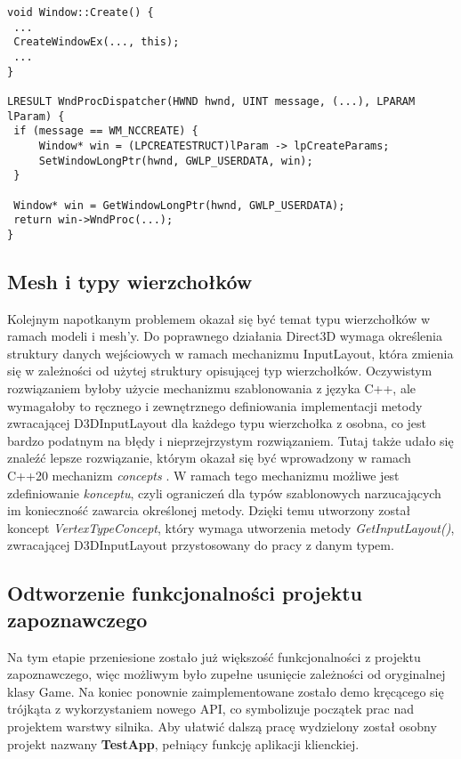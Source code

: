 \begin{lstlisting}[caption={Pseudokod integracji wskaźnika okna z uchwytem HWND}, label={lst:d3d11:render}]
void Window::Create() {
 ...
 CreateWindowEx(..., this);
 ...
}

LRESULT WndProcDispatcher(HWND hwnd, UINT message, (...), LPARAM lParam) {
 if (message == WM_NCCREATE) {
     Window* win = (LPCREATESTRUCT)lParam -> lpCreateParams;
     SetWindowLongPtr(hwnd, GWLP_USERDATA, win);
 }
	
 Window* win = GetWindowLongPtr(hwnd, GWLP_USERDATA);
 return win->WndProc(...);
}
\end{lstlisting}

\subsection{Mesh i typy wierzchołków}
Kolejnym napotkanym problemem okazał się być temat typu wierzchołków w ramach modeli i mesh'y. Do poprawnego działania Direct3D wymaga określenia struktury danych wejściowych w ramach mechanizmu InputLayout, która zmienia się w zależności od użytej struktury opisującej typ wierzchołków. Oczywistym rozwiązaniem byłoby użycie mechanizmu szablonowania z języka C++, ale wymagałoby to ręcznego i zewnętrznego definiowania implementacji metody zwracającej D3DInputLayout dla każdego typu wierzchołka z osobna, co jest bardzo podatnym na błędy i nieprzejrzystym rozwiązaniem. Tutaj także udało się znaleźć lepsze rozwiązanie, którym okazał się być wprowadzony w ramach C++20 mechanizm \textit{concepts} \cite{cpp20:concepts:2025}. W ramach tego mechanizmu możliwe jest zdefiniowanie \textit{konceptu}, czyli ograniczeń dla typów szablonowych narzucających im konieczność zawarcia określonej metody. Dzięki temu utworzony został koncept \textit{VertexTypeConcept}, który wymaga utworzenia metody \textit{GetInputLayout()}, zwracającej D3DInputLayout przystosowany do pracy z danym typem.

\subsection{Odtworzenie funkcjonalności projektu zapoznawczego}
Na tym etapie przeniesione zostało już większość funkcjonalności z projektu zapoznawczego, więc możliwym było zupełne usunięcie zależności od oryginalnej klasy Game. Na koniec ponownie zaimplementowane zostało demo kręcącego się trójkąta z wykorzystaniem nowego API, co symbolizuje początek prac nad projektem warstwy silnika. Aby ułatwić dalszą pracę wydzielony został osobny projekt nazwany \textbf{TestApp}, pełniący funkcję aplikacji klienckiej.

